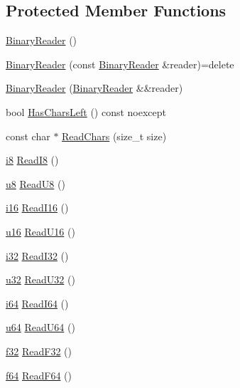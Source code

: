 \subsection*{Protected Member Functions}
\begin{DoxyCompactItemize}
\item 
\hyperlink{classmage_1_1_binary_reader_aab82579cef4f2f022273cf1adfcc8497}{Binary\+Reader} ()
\item 
\hyperlink{classmage_1_1_binary_reader_a8c1ff948f1d056439f3d8cc37d7f507c}{Binary\+Reader} (const \hyperlink{classmage_1_1_binary_reader}{Binary\+Reader} \&reader)=delete
\item 
\hyperlink{classmage_1_1_binary_reader_a3a24db5c872cca270596d53989ac8c91}{Binary\+Reader} (\hyperlink{classmage_1_1_binary_reader}{Binary\+Reader} \&\&reader)
\item 
bool \hyperlink{classmage_1_1_binary_reader_aec91fece03b619c158b133beb1bc9381}{Has\+Chars\+Left} () const noexcept
\item 
const char $\ast$ \hyperlink{classmage_1_1_binary_reader_af1e0e4ab815e23c72ab65fd7c0748d3f}{Read\+Chars} (size\+\_\+t size)
\item 
\hyperlink{namespacemage_ae590501eabc5b30d993320c2159423ee}{i8} \hyperlink{classmage_1_1_binary_reader_a80a9edbeb61e1e88c79a2f7d947ca872}{Read\+I8} ()
\item 
\hyperlink{namespacemage_a5a362e2d56fc439362a80516ecae7828}{u8} \hyperlink{classmage_1_1_binary_reader_af9feb92c6991f62a3866aae9caead1c3}{Read\+U8} ()
\item 
\hyperlink{namespacemage_a80228058266cc2ec5868d65b2a4c2f3c}{i16} \hyperlink{classmage_1_1_binary_reader_a7fb2f143eb79f90229a157d344236c2b}{Read\+I16} ()
\item 
\hyperlink{namespacemage_aaf695d763e29d308a85ee22c6489344e}{u16} \hyperlink{classmage_1_1_binary_reader_a35c4e93b44a6864df80ceee67d6eb940}{Read\+U16} ()
\item 
\hyperlink{namespacemage_ad59a7dbc22c51c308b6df9e9c3cafd62}{i32} \hyperlink{classmage_1_1_binary_reader_a0bff822c17c18e85cf7e05340acb1d9a}{Read\+I32} ()
\item 
\hyperlink{namespacemage_af2b398bf98eb10351f49cad73fe2cc73}{u32} \hyperlink{classmage_1_1_binary_reader_ac2f065778e87d58be3061469aaaa92e0}{Read\+U32} ()
\item 
\hyperlink{namespacemage_a3d629c1ab28148a782661e5b14b6fe5e}{i64} \hyperlink{classmage_1_1_binary_reader_af6d39f753e912c5ec1da13d411f756c0}{Read\+I64} ()
\item 
\hyperlink{namespacemage_aee97da48a07394dd617c9deb60ed2064}{u64} \hyperlink{classmage_1_1_binary_reader_a076c3f2ecc7634b297ae08b9fda48ea0}{Read\+U64} ()
\item 
\hyperlink{namespacemage_a6a44ad388483959dc4dff9f2aef91431}{f32} \hyperlink{classmage_1_1_binary_reader_a4edbec13821d82c471e8c155b1710f79}{Read\+F32} ()
\item 
\hyperlink{namespacemage_ab935747c6941320bd6214b5a5f265b09}{f64} \hyperlink{classmage_1_1_binary_reader_a5d3e1add9e6108f71f69e770983f4188}{Read\+F64} ()
\end{DoxyCompactItemize}
